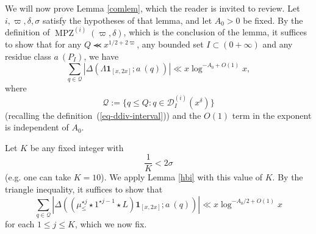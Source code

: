 \documentclass[12pt,a4paper,reqno]{amsart}
\numberwithin{equation}{section}
\DeclareMathOperator*\MPZ{MPZ}
\theoremstyle{plain}
\theoremstyle{definition}
\newcommand{\DI}[3]{\mathcal{D}_{{#1}}^{({#2})}({#3})}
\renewcommand{\lessapprox}{\llcurly}
\newcommand{\onef}{\mathbf{1}}
\begin{document}
We will now prove Lemma \ref{comlem}, which the reader is invited to
review.  Let $i,\varpi,\delta,\sigma$ satisfy the hypotheses of that
lemma, and let $A_0 > 0$ be fixed. By the definition of
$\MPZ^{(i)}(\varpi,\delta)$, which is the conclusion of the lemma, it
suffices to show that for any $Q \lessapprox x^{1/2+2\varpi}$, any
bounded set $I\subset (0+\infty)$ and any residue class $a\ (P_I)$, we
have
\begin{equation}\label{show}
  \sum_{q \in {\mathcal Q}} |\Delta(\Lambda \onef_{[x,2x]}; a\ (q))| 
  \ll x \log^{-A_0+O(1)} x,
\end{equation}
where %
\begin{equation}\label{eq-Q}
{\mathcal Q} := \{ q \leq Q: q \in \DI{I}{i}{x^\delta} \}
\end{equation}
(recalling the definition~(\ref{eq-ddiv-interval})) and the $O(1)$
term in the exponent is independent of $A_0$.

Let $K$ be any fixed integer with 
\begin{equation}\label{1k}
\frac{1}{K} < 2\sigma
\end{equation} 
(e.g. one can take $K=10$).  We apply Lemma \ref{hbi} with this value of $K$.  By the triangle inequality, it suffices to show that
\begin{equation}\label{sss}
 \sum_{q \in {\mathcal Q}} |\Delta((\mu_{\leq}^{\star j} \star 1^{\star j-1} \star L) \onef_{[x,2x]}; a\ (q))| \ll x \log^{-A_0/2+O(1)} x
\end{equation}
for each $1 \leq j \leq K$, which we now fix.
\end{document}
